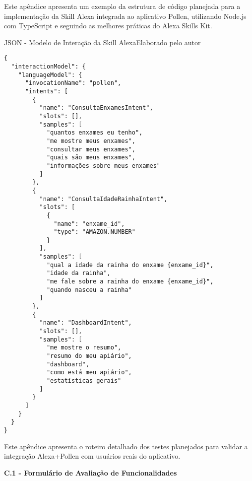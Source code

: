 \newpage

\label{apendice:codigo-skill}

Este apêndice apresenta um exemplo da estrutura de código planejada para a implementação da Skill Alexa integrada ao aplicativo Pollen, utilizando Node.js com TypeScript e seguindo as melhores práticas do Alexa Skills Kit.

\vspace{1em}

\begin{quadro}{JSON - Modelo de Interação da Skill Alexa}{Elaborado pelo autor}
\label{quad:codigo-interaction-model}
\begin{verbatim}
{
  "interactionModel": {
    "languageModel": {
      "invocationName": "pollen",
      "intents": [
        {
          "name": "ConsultaEnxamesIntent",
          "slots": [],
          "samples": [
            "quantos enxames eu tenho",
            "me mostre meus enxames",
            "consultar meus enxames",
            "quais são meus enxames",
            "informações sobre meus enxames"
          ]
        },
        {
          "name": "ConsultaIdadeRainhaIntent",
          "slots": [
            {
              "name": "enxame_id",
              "type": "AMAZON.NUMBER"
            }
          ],
          "samples": [
            "qual a idade da rainha do enxame {enxame_id}",
            "idade da rainha",
            "me fale sobre a rainha do enxame {enxame_id}",
            "quando nasceu a rainha"
          ]
        },
        {
          "name": "DashboardIntent",
          "slots": [],
          "samples": [
            "me mostre o resumo",
            "resumo do meu apiário",
            "dashboard",
            "como está meu apiário",
            "estatísticas gerais"
          ]
        }
      ]
    }
  }
}
\end{verbatim}
\end{quadro}

\newpage

\label{apendice:roteiro-testes}

Este apêndice apresenta o roteiro detalhado dos testes planejados para validar a integração Alexa+Pollen com usuários reais do aplicativo.

\vspace{1em}

\textbf{C.1 - Formulário de Avaliação de Funcionalidades}


